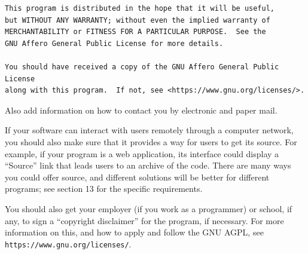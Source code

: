\documentclass[11pt]{article}
\begin{document}
\begin{enumerate}
{\begin{verbatim}
This program is distributed in the hope that it will be useful,
but WITHOUT ANY WARRANTY; without even the implied warranty of
MERCHANTABILITY or FITNESS FOR A PARTICULAR PURPOSE.  See the
GNU Affero General Public License for more details.

You should have received a copy of the GNU Affero General Public License
along with this program.  If not, see <https://www.gnu.org/licenses/>.
\end{verbatim}
}

Also add information on how to contact you by electronic and paper mail.

If your software can interact with users remotely through a computer
network, you should also make sure that it provides a way for users to
get its source.  For example, if your program is a web application, its
interface could display a ``Source'' link that leads users to an archive
of the code.  There are many ways you could offer source, and different
solutions will be better for different programs; see section 13 for the
specific requirements.

You should also get your employer (if you work as a programmer) or
school, if any, to sign a ``copyright disclaimer'' for the program, if
necessary.  For more information on this, and how to apply and follow
the GNU AGPL, see \texttt{https://www.gnu.org/licenses/}.

\end{enumerate}
\end{document}
